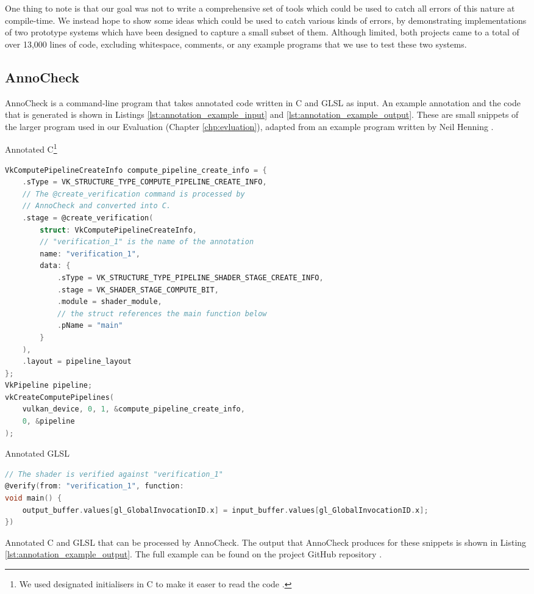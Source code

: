 \documentclass[a4paper,12pt,twoside,openright]{report}
\begin{document}
One thing to note is that our goal was not to write a comprehensive set of
tools which could be used to catch all errors of this nature at compile-time.
We instead hope to show some ideas which could be used to catch various kinds
of errors, by demonstrating implementations of two prototype systems which have
been designed to capture a small subset of them. Although limited, both
projects came to a total of over 13,000 lines of code, excluding whitespace,
comments, or any example programs that we use to test these two systems.

\subsection{AnnoCheck}

AnnoCheck is a command-line program that takes annotated code written in C and
GLSL as input. An example annotation and the code that is generated is shown in
Listings \ref{lst:annotation_example_input} and
\ref{lst:annotation_example_output}. These are small snippets of the larger
program used in our Evaluation (Chapter \ref{chp:evluation}), adapted from an
example program written by Neil Henning \cite{VulkanComputeExampleSource}
\cite{VulkanComputeExampleBlog}.

\begin{lstfloat}
\begin{center}
Annotated C\footnote{We used designated initialisers in C to make it easer to
read the code \cite{DesignatedInitC}.}
\end{center}
\begin{lstlisting}[language=C]
VkComputePipelineCreateInfo compute_pipeline_create_info = {
    .sType = VK_STRUCTURE_TYPE_COMPUTE_PIPELINE_CREATE_INFO,
    // The @create_verification command is processed by
    // AnnoCheck and converted into C.
    .stage = @create_verification(
        struct: VkComputePipelineCreateInfo,
        // "verification_1" is the name of the annotation
        name: "verification_1",
        data: {
            .sType = VK_STRUCTURE_TYPE_PIPELINE_SHADER_STAGE_CREATE_INFO,
            .stage = VK_SHADER_STAGE_COMPUTE_BIT,
            .module = shader_module,
            // the struct references the main function below
            .pName = "main"
        }
    ),
    .layout = pipeline_layout
};
VkPipeline pipeline;
vkCreateComputePipelines(
    vulkan_device, 0, 1, &compute_pipeline_create_info,
    0, &pipeline
);
\end{lstlisting}
\begin{center} Annotated GLSL \end{center}
\begin{lstlisting}[language=C]
// The shader is verified against "verification_1"
@verify(from: "verification_1", function:
void main() {
    output_buffer.values[gl_GlobalInvocationID.x] = input_buffer.values[gl_GlobalInvocationID.x];
})
\end{lstlisting}
\caption{Annotated C and GLSL that can be processed by AnnoCheck. The output
that AnnoCheck produces for these snippets is shown in
Listing \ref{lst:annotation_example_output}. The full example can be found on
the project GitHub repository \cite{ProjectSource}.}
\label{lst:annotation_example_input}
\end{lstfloat}
\end{document}
